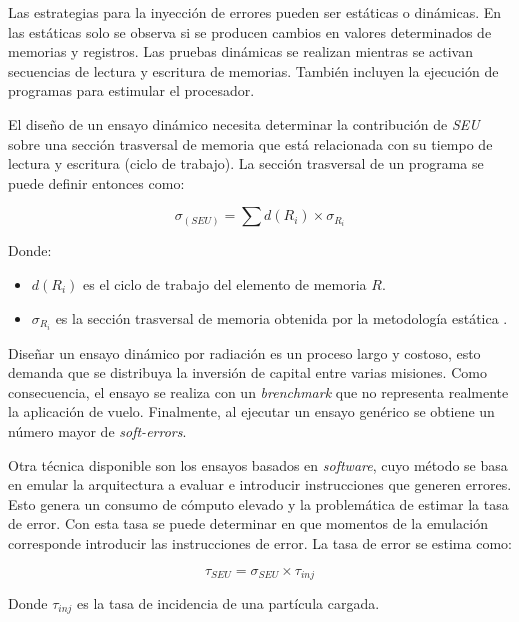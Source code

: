
Las estrategias para la inyección de errores pueden ser estáticas o dinámicas.
En las estáticas solo se observa si se producen cambios en valores determinados de memorias y registros.
Las pruebas dinámicas se realizan mientras se activan secuencias de lectura y escritura de memorias.
También incluyen la ejecución de programas para estimular el procesador.

El diseño de un ensayo dinámico necesita determinar la contribución de \emph{SEU} sobre una sección trasversal de memoria que está relacionada con su tiempo de lectura y escritura (ciclo de trabajo).
La sección trasversal de un programa se puede definir entonces como:

\begin{equation}
	\label{eq:crosssection}
    \sigma_{(SEU)} = \sum{d(R_i) \times \sigma_{R_i}}
\end{equation}

Donde:
\begin{itemize}
    \item $ d(R_i) $ es el ciclo de trabajo del elemento de memoria $ R $.
    \item $ \sigma_{R_i} $ es la sección trasversal de memoria obtenida por la metodología estática \citep{ARTICLE:velazco}.
\end{itemize}

Diseñar un ensayo dinámico por radiación es un proceso largo y costoso, esto demanda que se distribuya la inversión de capital entre varias misiones.
Como consecuencia, el ensayo se realiza con un \emph{brenchmark} que no representa realmente la aplicación de vuelo.
Finalmente, al ejecutar un ensayo genérico se obtiene un número mayor de \emph{soft-errors}.

Otra técnica disponible son los ensayos basados en \emph{software}, cuyo método se basa en emular la arquitectura a evaluar e introducir instrucciones que generen errores.
Esto genera un consumo de cómputo elevado y la problemática de estimar la tasa de error.
Con esta tasa se puede determinar en que momentos de la emulación corresponde introducir las instrucciones de error.
La tasa de error se estima como:

\begin{equation}
	\label{eq:errorrate}
    \tau_{SEU} = \sigma_{SEU} \times \tau_{inj}
\end{equation}

Donde $ \tau_{inj} $ es la tasa de incidencia de una partícula cargada.


